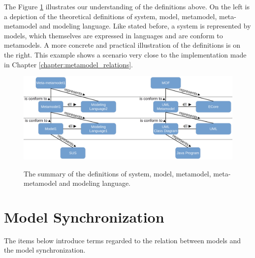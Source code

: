 \documentclass[tuberlin,cic,tc,english,noabntcite, oneside]{iiufrgs}
\begin{document}
	The Figure \ref{fig:model_scheme} illustrates our understanding of the definitions above. On the left is a depiction of the theoretical definitions of system, model, metamodel, meta-metamodel and modeling language. Like stated before, a system is represented by models, which themselves are expressed in languages and are conform to metamodels. A more concrete and practical illustration of the definitions is on the right. This example shows a scenario very close to the implementation made in Chapter \ref{chapter:metamodel_relations}.
	
	\begin{figure}[H]
		\centering
		\caption{The summary of the definitions of system, model, metamodel, meta-metamodel and modeling language.}
		\includegraphics[width=\textwidth]{model_scheme}
		\label{fig:model_scheme}
	\end{figure}
	
\section{Model Synchronization}
The items below introduce terms regarded to the relation between models and the model synchronization.
\end{document}
